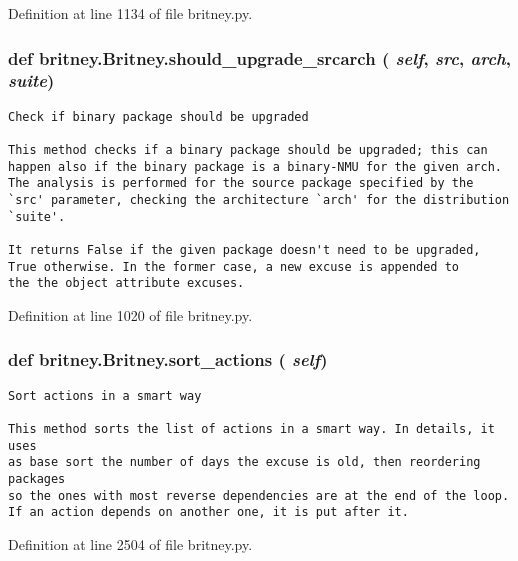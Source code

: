Definition at line 1134 of file britney.py.
\subsubsection{\setlength{\rightskip}{0pt plus 5cm}def britney.Britney.should\_\-upgrade\_\-srcarch ( {\em self},  {\em src},  {\em arch},  {\em suite})}\label{classbritney_1_1Britney_bd18d7acde434387e94344a39db5b0e5}




\footnotesize\begin{verbatim}Check if binary package should be upgraded

This method checks if a binary package should be upgraded; this can
happen also if the binary package is a binary-NMU for the given arch.
The analysis is performed for the source package specified by the
`src' parameter, checking the architecture `arch' for the distribution
`suite'.
       
It returns False if the given package doesn't need to be upgraded,
True otherwise. In the former case, a new excuse is appended to
the the object attribute excuses.
\end{verbatim}
\normalsize
 

Definition at line 1020 of file britney.py.
\subsubsection{\setlength{\rightskip}{0pt plus 5cm}def britney.Britney.sort\_\-actions ( {\em self})}\label{classbritney_1_1Britney_70115e28e2ee6aa3a09d1efbd81b4a87}




\footnotesize\begin{verbatim}Sort actions in a smart way

This method sorts the list of actions in a smart way. In details, it uses
as base sort the number of days the excuse is old, then reordering packages
so the ones with most reverse dependencies are at the end of the loop.
If an action depends on another one, it is put after it.
\end{verbatim}
\normalsize
 

Definition at line 2504 of file britney.py.
